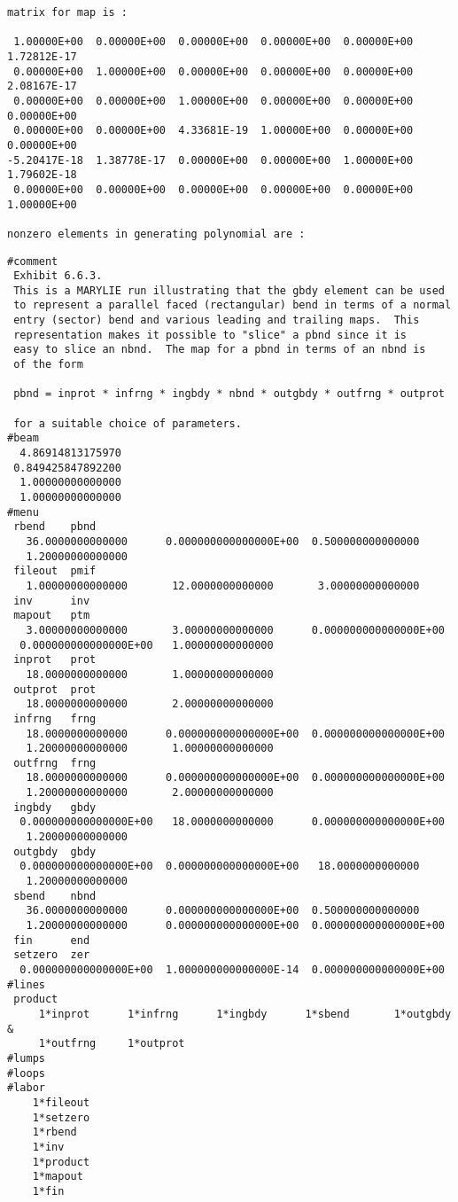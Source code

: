 \begin{footnotesize}
\begin{verbatim}
matrix for map is :

 1.00000E+00  0.00000E+00  0.00000E+00  0.00000E+00  0.00000E+00  1.72812E-17
 0.00000E+00  1.00000E+00  0.00000E+00  0.00000E+00  0.00000E+00  2.08167E-17
 0.00000E+00  0.00000E+00  1.00000E+00  0.00000E+00  0.00000E+00  0.00000E+00
 0.00000E+00  0.00000E+00  4.33681E-19  1.00000E+00  0.00000E+00  0.00000E+00
-5.20417E-18  1.38778E-17  0.00000E+00  0.00000E+00  1.00000E+00  1.79602E-18
 0.00000E+00  0.00000E+00  0.00000E+00  0.00000E+00  0.00000E+00  1.00000E+00

nonzero elements in generating polynomial are :
\end{verbatim}
\end{footnotesize}

\newpage
\begin{footnotesize}
\begin{verbatim}
#comment
 Exhibit 6.6.3.
 This is a MARYLIE run illustrating that the gbdy element can be used
 to represent a parallel faced (rectangular) bend in terms of a normal
 entry (sector) bend and various leading and trailing maps.  This
 representation makes it possible to "slice" a pbnd since it is
 easy to slice an nbnd.  The map for a pbnd in terms of an nbnd is
 of the form

 pbnd = inprot * infrng * ingbdy * nbnd * outgbdy * outfrng * outprot

 for a suitable choice of parameters.
#beam
  4.86914813175970
 0.849425847892200
  1.00000000000000
  1.00000000000000
#menu
 rbend    pbnd
   36.0000000000000      0.000000000000000E+00  0.500000000000000
   1.20000000000000
 fileout  pmif
   1.00000000000000       12.0000000000000       3.00000000000000
 inv      inv
 mapout   ptm
   3.00000000000000       3.00000000000000      0.000000000000000E+00
  0.000000000000000E+00   1.00000000000000
 inprot   prot
   18.0000000000000       1.00000000000000
 outprot  prot
   18.0000000000000       2.00000000000000
 infrng   frng
   18.0000000000000      0.000000000000000E+00  0.000000000000000E+00
   1.20000000000000       1.00000000000000
 outfrng  frng
   18.0000000000000      0.000000000000000E+00  0.000000000000000E+00
   1.20000000000000       2.00000000000000
 ingbdy   gbdy
  0.000000000000000E+00   18.0000000000000      0.000000000000000E+00
   1.20000000000000
 outgbdy  gbdy
  0.000000000000000E+00  0.000000000000000E+00   18.0000000000000
   1.20000000000000
 sbend    nbnd
   36.0000000000000      0.000000000000000E+00  0.500000000000000
   1.20000000000000      0.000000000000000E+00  0.000000000000000E+00
 fin      end
 setzero  zer
  0.000000000000000E+00  1.000000000000000E-14  0.000000000000000E+00
#lines
 product
     1*inprot      1*infrng      1*ingbdy      1*sbend       1*outgbdy  &
     1*outfrng     1*outprot
#lumps
#loops
#labor
    1*fileout
    1*setzero
    1*rbend
    1*inv
    1*product
    1*mapout
    1*fin


\end{verbatim}
\end{footnotesize}
